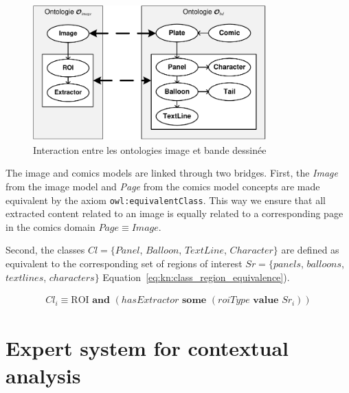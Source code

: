 \begin{figure}[h!]
\begin{center}
\includegraphics[width=0.8\textwidth]{interaction.pdf}
\caption{Interaction entre les ontologies image et bande dessinée}
\label{fig:interaction}
\end{center}
\end{figure}

The image and comics models are linked through two bridges.
First, the \textit{Image} from the image model and \textit{Page} from the comics model concepts are made equivalent by the axiom \texttt{owl:equivalentClass}.
This way we ensure that all extracted content related to an image is equally related to a corresponding page in the comics domain $Page \equiv  Image$.

Second, the classes $Cl=\{Panel$, $Balloon$, $TextLine$, $Character\}$ are defined as equivalent to the corresponding set of regions of interest $Sr = \{panels$, $balloons$, $text lines$, $characters\}$ Equation~\ref{eq:kn:class_region_equivalence}).%
  

\begin{equation}
\label{eq:kn:class_region_equivalence}
\begin{split}
Cl_i  \equiv \text{ROI} \textbf{ and } (hasExtractor \textbf{ some } (roiType \textbf{ value } Sr_i ))
\end{split}
\end{equation}



\section{Expert system for contextual analysis} %
\label{sec:kn:expert_system}

